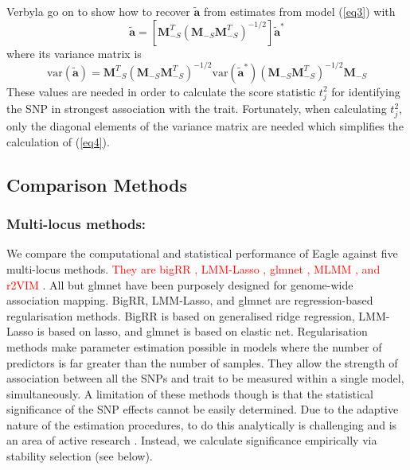 \documentclass{bioinfo}
\newcommand{\bwidetildea}{\widetilde{\bm{a}}}
\newcommand{\bM}{\bm{M}}
\begin{document}
Verbyla \citep{verbyla2012rwgaim,verbyla2014whole} go on to show how to recover $\bwidetildea$ from estimates from model  (\ref{eq3})  with 
\begin{equation}
\bwidetildea = \left [ \bM_{-S}^T (\bM_{-S} \bM_{-S}^T)^{-1/2} \right ] \bwidetildea^*
\end{equation}
where its variance matrix is
\begin{equation}
\label{eq4}
\textrm{var}(\bwidetildea) = \bM_{-S}^T (\bM_{-S} \bM_{-S}^T)^{-1/2} \textrm{var}(\bwidetildea^*) (\bM_{-S} \bM_{-S}^T)^{-1/2} \bM_{-S}
\end{equation}
These values are needed in order to calculate the score statistic $t_j^2$ for identifying the SNP in strongest association with the trait. 
Fortunately, when calculating $t_j^2$, only the diagonal elements of the variance matrix are needed which simplifies the  calculation 
of (\ref{eq4}). 


\subsection{Comparison Methods}

 \subsubsection{ Multi-locus methods:} We compare the computational and statistical performance of Eagle against five multi-locus methods. \textcolor{red}{They are bigRR  \citep{shen2013novel}, LMM-Lasso \citep{rakitsch2013lasso}, glmnet \citep{Friedman2010glmnet}, 
MLMM \citep{segura2012efficient}, and r2VIM \citep{szymczak2016r2vim}}.  All but glmnet have been purposely designed for genome-wide association mapping. 
BigRR, LMM-Lasso, and glmnet are regression-based regularisation 
methods. BigRR is based on generalised ridge regression, LMM-Lasso is based on lasso, and glmnet is based on elastic net. 
Regularisation methods make parameter estimation possible in models  where the number of predictors is far greater than the number of samples. 
They allow the strength of association between all the SNPs and trait to be measured within a single model, simultaneously. 
A limitation of these methods though is that the statistical significance of the SNP effects cannot be easily determined. 
 Due to the adaptive nature of the estimation procedures, to do this 
analytically is challenging and is an area of active research \citep{lockhart2014significance}. Instead, we calculate significance empirically via 
stability selection (see below). 
\end{document}
